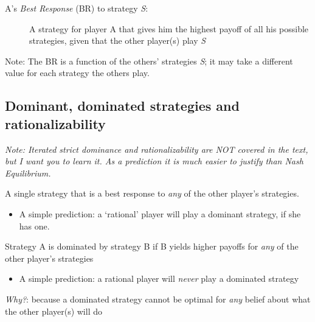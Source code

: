 \documentclass[]{article}
\providecommand{\tightlist}{%
  \setlength{\itemsep}{0pt}\setlength{\parskip}{0pt}}
\begin{document}
\begin{description}
\item[A's \emph{Best Response} (BR) to strategy \emph{S}:]
A strategy for player A that gives him the highest payoff of all his
possible strategies, given that the other player(s) play \emph{S}
\end{description}

Note: The BR is a function of the others' strategies \emph{S}; it may
take a different value for each strategy the others play.

\hypertarget{dominant-dominated-strategies-and-rationalizability}{%
\subsection{Dominant, dominated strategies and
rationalizability}\label{dominant-dominated-strategies-and-rationalizability}}

\emph{Note: Iterated strict dominance and rationalizability are NOT
covered in the text, but I want you to learn it. As a prediction it is
much easier to justify than Nash Equilibrium.}

\bigskip

\begin{description}
\tightlist
\item[Dominant strategy]
A single strategy that is a best response to \emph{any} of the other
player's strategies.
\end{description}

\begin{itemize}
\tightlist
\item
  A simple prediction: a `rational' player will play a dominant
  strategy, if she has one.
\end{itemize}

\begin{description}
\tightlist
\item[Dominated strategy (not in text!)]
Strategy A is dominated by strategy B if B yields higher payoffs for
\emph{any} of the other player's strategies
\end{description}

\begin{itemize}
\tightlist
\item
  A simple prediction: a rational player will \emph{never} play a
  dominated strategy
\end{itemize}

\emph{Why?}: because a dominated strategy cannot be optimal for
\emph{any} belief about what the other player(s) will do
\end{document}
